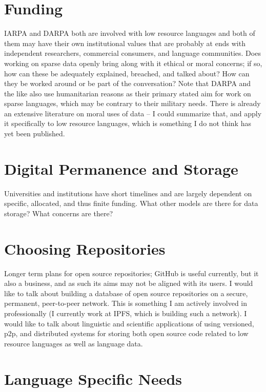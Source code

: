 \documentclass[10pt, a4paper]{article}
\begin{document}
\section{Funding}

IARPA and DARPA both are involved with low resource languages and both of them may have their own institutional values that are probably at ends with independent researchers, commercial consumers, and language communities. Does working on sparse data openly bring along with it ethical or moral concerns; if so, how can these be adequately explained, breached, and talked about? How can they be worked around or be part of the conversation? Note that DARPA and the like also use humanitarian reasons as their primary stated aim for work on sparse languages, which may be contrary to their military needs. There is already an extensive literature on moral uses of data -- I could summarize that, and apply it specifically to low resource languages, which is something I do not think has yet been published.

\section{Digital Permanence and Storage}

Universities and institutions have short timelines and are largely dependent on specific, allocated, and thus finite funding. What other models are there for data storage? What concerns are there?

\section{Choosing Repositories}

Longer term plans for open source repositories; GitHub is useful currently, but it also a business, and as such its aims may not be aligned with its users. I would like to talk about building a database of open source repositories on a secure, permanent, peer-to-peer network. This is something I am actively involved in professionally (I currently work at IPFS, which is building such a network). I would like to talk about linguistic and scientific applications of using versioned, p2p, and distributed systems for storing both open source code related to low resource languages as well as language data. 

\section{Language Specific Needs}
\end{document}
